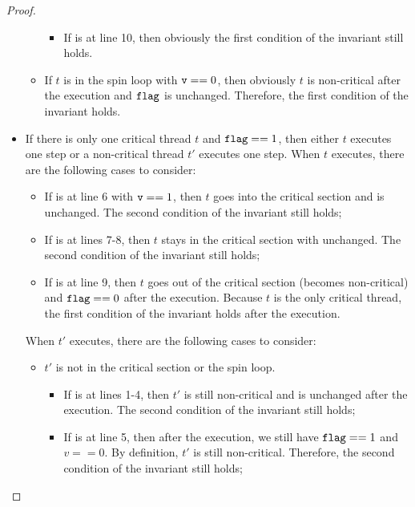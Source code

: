\documentclass{article}[10pt]
\begin{document}
\begin{proof}
\begin{itemize}
\begin{itemize}
\begin{itemize}
      \item If  is at line 10, then obviously the first
        condition of the invariant still holds.

      \end{itemize}


    \item If $t$ is in the spin loop with $\text{\ttfamily v} == 0$, then obviously
      $t$ is non-critical after the execution and $\text{\ttfamily flag}$ is
      unchanged. Therefore, the first condition of the invariant
      holds.

    \end{itemize}
    
  \item If there is only one critical thread $t$ and $\text{\ttfamily flag} == 1$,
    then either $t$ executes one step or a non-critical thread $t'$
    executes one step. When $t$ executes, there are the following
    cases to consider:
    \begin{itemize}
    \item If  is at line 6 with $\text{\ttfamily v} == 1$, then $t$ goes into
      the critical section and \kflag is unchanged. The second
      condition of the invariant still holds;

    \item If  is at lines 7-8, then $t$ stays in the critical
      section with \kflag unchanged. The second condition of the
      invariant still holds;

    \item If  is at line 9, then $t$ goes out of the critical
      section (becomes non-critical) and $\text{\ttfamily flag} == 0$ after
      the execution. Because $t$ is the only critical thread, the first
      condition of the invariant holds after the execution.
    \end{itemize}
    When $t'$ executes, there are the following cases to consider:
    \begin{itemize}
    \item $t'$ is not in the critical section or the spin loop. 
      \begin{itemize}
      \item If  is at lines 1-4, then $t'$ is still
        non-critical and \kflag is unchanged after the execution. The
        second condition of the invariant still holds;

      \item If  is at line 5, then after the execution, we
        still have $\text{\ttfamily flag} == 1$ and $v == 0$. By definition, $t'$ is
        still non-critical. Therefore, the second condition of the
        invariant still holds;


\end{itemize}
\end{itemize}
\end{itemize}
\end{proof}
\end{document}
